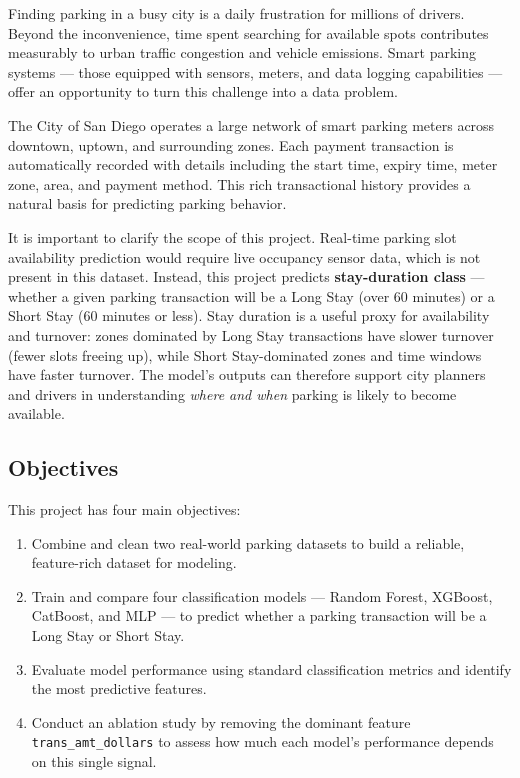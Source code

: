 \documentclass[12pt, a4paper]{article}
\begin{document}
Finding parking in a busy city is a daily frustration for millions of
drivers. Beyond the inconvenience, time spent searching for available
spots contributes measurably to urban traffic congestion and vehicle
emissions. Smart parking systems --- those equipped with sensors, meters,
and data logging capabilities --- offer an opportunity to turn this
challenge into a data problem.

The City of San Diego operates a large network of smart parking meters
across downtown, uptown, and surrounding zones. Each payment transaction
is automatically recorded with details including the start time, expiry
time, meter zone, area, and payment method. This rich transactional
history provides a natural basis for predicting parking behavior.

It is important to clarify the scope of this project. Real-time parking
slot availability prediction would require live occupancy sensor data,
which is not present in this dataset. Instead, this project predicts
\textbf{stay-duration class} --- whether a given parking transaction
will be a Long Stay (over 60 minutes) or a Short Stay (60 minutes or
less). Stay duration is a useful proxy for availability and turnover:
zones dominated by Long Stay transactions have slower turnover (fewer
slots freeing up), while Short Stay-dominated zones and time windows
have faster turnover. The model's outputs can therefore support city
planners and drivers in understanding \textit{where and when} parking
is likely to become available.

\subsection*{Objectives}
This project has four main objectives:
\begin{enumerate}
    \item Combine and clean two real-world parking datasets to build
    a reliable, feature-rich dataset for modeling.
    \item Train and compare four classification models --- Random
    Forest, XGBoost, CatBoost, and MLP --- to predict whether a
    parking transaction will be a Long Stay or Short Stay.
    \item Evaluate model performance using standard classification
    metrics and identify the most predictive features.
    \item Conduct an ablation study by removing the dominant feature
    \texttt{trans\_amt\_dollars} to assess how much each model's
    performance depends on this single signal.
\end{enumerate}
\end{document}
